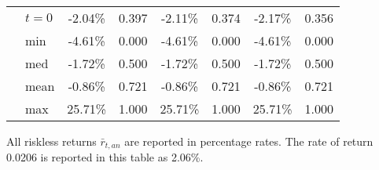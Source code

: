 \documentclass[letterpaper,12pt]{article}
\theoremstyle{definition}
\begin{document}
\begin{spacing}{1.5}
\begin{table}[htbp]
\begin{threeparttable}
\begin{tabular}{>{\small}c >{\small}l| >{\small}c >{\small}c| >{\small}c >{\small}c| >{\small}c >{\small}c}
      & $t=0$ & -2.04\% & 0.397 & -2.11\% & 0.374 & -2.17\% & 0.356 \\
      & min & -4.61\% & 0.000 & -4.61\% & 0.000 & -4.61\% & 0.000 \\
      & med & -1.72\% & 0.500 & -1.72\% & 0.500 & -1.72\% & 0.500 \\
      & mean & -0.86\% & 0.721 & -0.86\% & 0.721 & -0.86\% & 0.721 \\
      & max & 25.71\% & 1.000 & 25.71\% & 1.000 & 25.71\% & 1.000 \\
      \hline\hline
    \end{tabular}
    \begin{tablenotes}
      \scriptsize{\item[]All riskless returns $\bar{r}_{t,an}$ are reported in percentage rates. The rate of return 0.0206 is reported in this table as 2.06\%.}
    \end{tablenotes}
    \end{threeparttable}
  \end{table}


\end{spacing}
\end{document}
